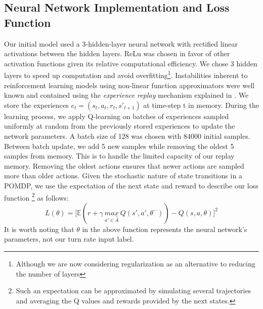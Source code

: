 \documentclass[journal, a4paper]{IEEEtran}
\begin{document}
\subsection{Neural Network Implementation and Loss Function}
Our initial model used a 3-hidden-layer neural network with rectified linear activations between the hidden layers. ReLu was chosen in favor of other activation functions given its relative computational efficiency. We chose 3 hidden layers to speed up computation and avoid overfitting\footnote{Although we are now considering regularization as an alternative to reducing the number of layers}. Instabilities inherent to reinforcement learning models using non-linear function approximators were well known and contained using the \textit{experience replay} mechanism explained in \cite{humanlevelcontrol}. We store the experiences $e_t = (s_t, a_t, r_t, s'_{t+1})$ at time-step t in memory. During the learning process, we apply Q-learning on batches of experiences sampled uniformly at random from the previously stored experiences to update the network parameters. A batch size of 128 was chosen with 84000 initial samples. Between batch update, we add 5 new samples while removing the oldest 5 samples from memory. This is to handle the limited capacity of our replay memory. Removing the oldest actions ensures that newer actions are sampled more than older actions. Given the stochastic nature of state transitions in a POMDP, we use the expectation of the next state and reward to describe our loss function \footnote{Such an expectation can be approximated by simulating several trajectories and averaging the Q values and rewards provided by the next states.} as follows: \[L(\theta) = \Bigg[\mathbb{E}(r + \gamma \: \underset{a' \in \overset{\circ}{A}}{max} \: Q(s', a', \theta^-)) - Q(s,a,\theta)\Bigg]^2 \]
It is worth noting that $\theta$ in the above function represents the neural network's parameters, not our turn rate input label.
\end{document}
